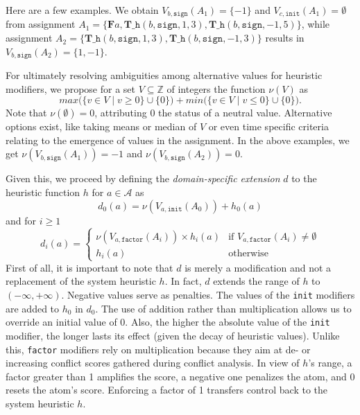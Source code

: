 \documentclass[letterpaper]{article}
\newcommand{\hpredicate}{\texttt{\_h}}
\newcommand{\hpred}[4]{\ensuremath{\hpredicate(#1,{#2},#3,#4)}}
\newcommand{\true}{\ensuremath{\boldsymbol{T}}}
\newcommand{\false}{\ensuremath{\boldsymbol{F}}}
\newcommand{\Tsigned}[1]{\ensuremath{\true{#1}}}\message{ *** RENAME *** }
\newcommand{\Fsigned}[1]{\ensuremath{\false{#1}}}
\newcommand{\ass}{\ensuremath{A}}
\begin{document}
Here are a few examples.
We obtain %
$V_{b,\mathtt{sign}}(\ass_1)=\{-1\}$
and
$V_{c,\mathtt{init}}(\ass_1)=\emptyset$
from assignment
\(
\ass_1=\{\Fsigned{a},\Tsigned{\hpred{b}{\mathtt{sign}}{1}{3}},\Tsigned{\hpred{b}{\mathtt{sign}}{-1}{5}}\}
\),
while assignment
\(
\ass_2=\{\Tsigned{\hpred{b}{\mathtt{sign}}{1}{3}},\Tsigned{\hpred{b}{\mathtt{sign}}{-1}{3}}\}
\)
results in $V_{b,\mathtt{sign}}(\ass_2)=\{1,-1\}$.

For ultimately resolving ambiguities among alternative values for heuristic modifiers, 
we propose for a set $V\subseteq\mathbb{Z}$ of integers the function $\nu(V)$ as
\[
\mathit{max}\big(\{v\in V\!\mid v\geq 0\}\cup\{0\}\big)
+
\mathit{min}\big(\{v\in V\!\mid v\leq 0\}\cup\{0\}\big).
\]
Note that $\nu(\emptyset)=0$, attributing 0 the status of a neutral value.
Alternative options exist, like taking means or median of $V$ or even time specific criteria
relating to the emergence of values in the assignment.
%
In the above examples,
we get $\nu(V_{b,\mathtt{sign}}(\ass_1))=-1$ and $\nu(V_{b,\mathtt{sign}}(\ass_2))=0$.

Given this, we proceed by defining the \emph{domain-specific extension} $d$ to the heuristic function $h$ 
for $a\in\mathcal{A}$ as
\[
d_0(a)=\nu(V_{a,\mathtt{init}}(\ass_0))+h_0(a)
\]
and for $i\geq 1$
\[
d_i(a)=
\left\{
  \begin{array}{rl}
    \nu(V_{a,\mathtt{factor}}(\ass_i))\times h_i(a)&\text{if } V_{a,\mathtt{factor}}(\ass_i)\neq\emptyset
    \\
                                             h_i(a)&\text{otherwise}
  \end{array}
\right.
\]
First of all, it is important to note that $d$ is merely a modification and not a replacement of the
system heuristic $h$.
In fact, $d$ extends the range of $h$ to $(-\infty,+\infty)$.
Negative values serve as penalties.
The values of the \texttt{init} modifiers are added to $h_0$ in $d_0$.
The use of addition rather than multiplication allows us to override an initial value of 0.
Also, the higher the absolute value of the \texttt{init} modifier, the longer lasts its effect
(given the decay of heuristic values).
Unlike this, \texttt{factor} modifiers rely on multiplication because they aim at de- or increasing
conflict scores gathered during conflict analysis.
In view of $h$'s range,
a factor greater than 1 amplifies the score, a negative one penalizes the atom, and 0 resets the atom's score.
Enforcing a factor of 1 
transfers control back to the system heuristic $h$.
\end{document}
